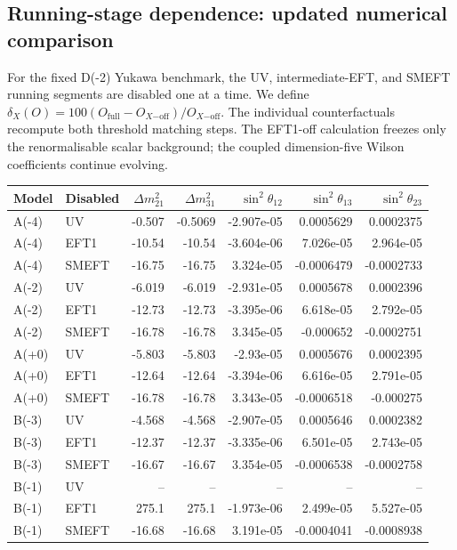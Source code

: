 \subsection*{Running-stage dependence: updated numerical comparison}
For the fixed D(-2) Yukawa benchmark, the
UV, intermediate-EFT, and SMEFT running segments are disabled one at a time.
We define $\delta_X(O)=100(O_{\mathrm{full}}-O_{X\mathrm{-off}})/O_{X\mathrm{-off}}$.
The individual counterfactuals recompute both threshold matching steps.
The EFT1-off calculation freezes only the renormalisable scalar background;
the coupled dimension-five Wilson coefficients continue evolving.
\begin{table}[htbp]
\centering
\scriptsize
\begin{tabular}{llrrrrr}
\hline
Model & Disabled & $\Delta m^2_{21}$ & $\Delta m^2_{31}$ & $\sin^2\theta_{12}$ & $\sin^2\theta_{13}$ & $\sin^2\theta_{23}$ \\
\hline
A(-4) & UV & -0.507 & -0.5069 & -2.907e-05 & 0.0005629 & 0.0002375 \\
A(-4) & EFT1 & -10.54 & -10.54 & -3.604e-06 & 7.026e-05 & 2.964e-05 \\
A(-4) & SMEFT & -16.75 & -16.75 & 3.324e-05 & -0.0006479 & -0.0002733 \\
A(-2) & UV & -6.019 & -6.019 & -2.931e-05 & 0.0005678 & 0.0002396 \\
A(-2) & EFT1 & -12.73 & -12.73 & -3.395e-06 & 6.618e-05 & 2.792e-05 \\
A(-2) & SMEFT & -16.78 & -16.78 & 3.345e-05 & -0.000652 & -0.0002751 \\
A(+0) & UV & -5.803 & -5.803 & -2.93e-05 & 0.0005676 & 0.0002395 \\
A(+0) & EFT1 & -12.64 & -12.64 & -3.394e-06 & 6.616e-05 & 2.791e-05 \\
A(+0) & SMEFT & -16.78 & -16.78 & 3.343e-05 & -0.0006518 & -0.000275 \\
B(-3) & UV & -4.568 & -4.568 & -2.907e-05 & 0.0005646 & 0.0002382 \\
B(-3) & EFT1 & -12.37 & -12.37 & -3.335e-06 & 6.501e-05 & 2.743e-05 \\
B(-3) & SMEFT & -16.67 & -16.67 & 3.354e-05 & -0.0006538 & -0.0002758 \\
B(-1) & UV & -- & -- & -- & -- & -- \\
B(-1) & EFT1 & 275.1 & 275.1 & -1.973e-06 & 2.499e-05 & 5.527e-05 \\
B(-1) & SMEFT & -16.68 & -16.68 & 3.191e-05 & -0.0004041 & -0.0008938 \\

\end{tabular}
\end{table}

